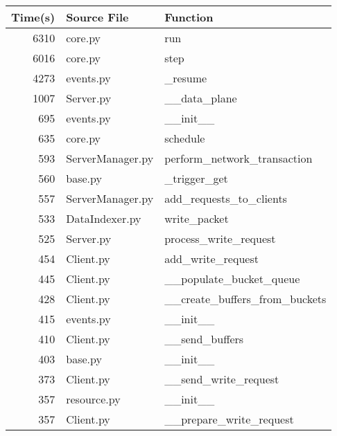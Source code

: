 \begin{tabular}{r | l | l}
    \textbf{Time(s)} & \textbf{Source File} & \textbf{Function} \\\hline
    6310 & core.py & run \\
    6016 & core.py & step \\
    4273 & events.py & \_resume \\
    1007 & Server.py & \_\_data\_plane \\
    695 & events.py & \_\_init\_\_ \\
    635 & core.py & schedule \\
    593 & ServerManager.py & perform\_network\_transaction \\
    560 & base.py & \_trigger\_get \\
    557 & ServerManager.py & add\_requests\_to\_clients \\
    533 & DataIndexer.py & write\_packet \\
    525 & Server.py & process\_write\_request \\
    454 & Client.py & add\_write\_request \\
    445 & Client.py & \_\_populate\_bucket\_queue \\
    428 & Client.py & \_\_create\_buffers\_from\_buckets \\
    415 & events.py & \_\_init\_\_ \\
    410 & Client.py & \_\_send\_buffers \\
    403 & base.py & \_\_init\_\_ \\
    373 & Client.py & \_\_send\_write\_request \\
    357 & resource.py & \_\_init\_\_ \\
    357 & Client.py & \_\_prepare\_write\_request \\
\end{tabular} \\

